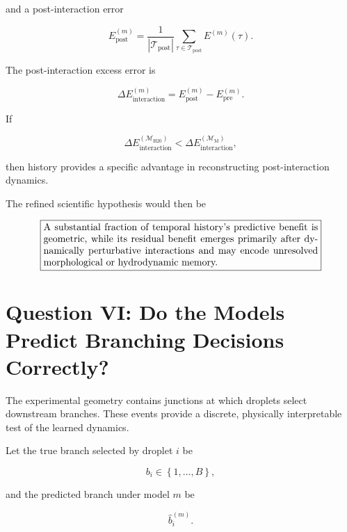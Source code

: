 \documentclass[11pt]{article}
\newcommand{\Mhist}{\mathcal{M}_{\mathrm{H20}}}
\newcommand{\Mmark}{\mathcal{M}_{\mathrm{M}}}
\begin{document}
and a post-interaction error

\begin{equation}
E_{\mathrm{post}}^{(m)}
=
\frac{1}{|\mathcal{T}_{\mathrm{post}}|}
\sum_{\tau\in\mathcal{T}_{\mathrm{post}}}
E^{(m)}(\tau).
\end{equation}

The post-interaction excess error is

\begin{equation}
\Delta E_{\mathrm{interaction}}^{(m)}
=
E_{\mathrm{post}}^{(m)}
-
E_{\mathrm{pre}}^{(m)}.
\end{equation}

If

\begin{equation}
\Delta E_{\mathrm{interaction}}^{(\Mhist)}
<
\Delta E_{\mathrm{interaction}}^{(\Mmark)},
\end{equation}

then history provides a specific advantage in reconstructing post-interaction dynamics.

The refined scientific hypothesis would then be

\begin{equation}
\boxed{
\begin{minipage}{0.82\textwidth}
A substantial fraction of temporal history's predictive benefit is geometric, while its residual benefit emerges primarily after dynamically perturbative interactions and may encode unresolved morphological or hydrodynamic memory.
\end{minipage}
}
\end{equation}

\section{Question VI: Do the Models Predict Branching Decisions Correctly?}

The experimental geometry contains junctions at which droplets select downstream branches. These events provide a discrete, physically interpretable test of the learned dynamics.

Let the true branch selected by droplet \(i\) be

\begin{equation}
b_i
\in
\left\{
1,\ldots,B
\right\},
\end{equation}

and the predicted branch under model \(m\) be

\begin{equation}
\hat{b}_i^{(m)}.
\end{equation}
\end{document}
